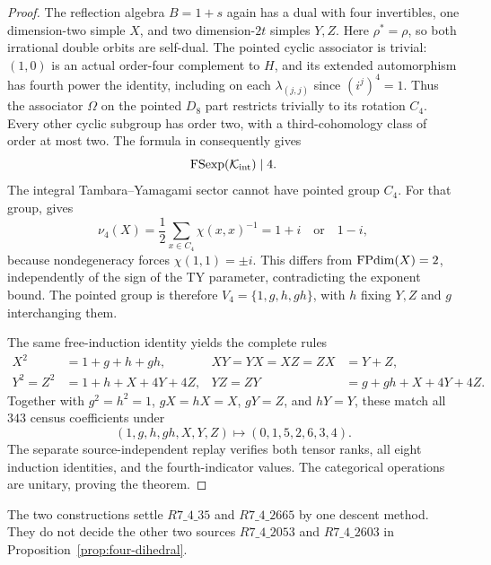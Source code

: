 \begin{proof}
The reflection algebra $B=1+s$ again has a dual with four invertibles,
one dimension-two simple $X$, and two dimension-$2t$ simples $Y,Z$.
Here $\rho^*=\rho$, so both irrational double orbits are self-dual.
The pointed cyclic associator is trivial: $(1,0)$ is an actual
order-four complement to $H$, and its extended automorphism has fourth
power the identity, including on each $\lambda_{(j,j)}$ since
$(i^j)^4=1$.
Thus the associator $\Omega$ on the pointed $D_8$ part restricts
trivially to its rotation $C_4$. Every other cyclic subgroup has
order two, with a third-cohomology class of order at most two.
The formula in \cite[Theorem~9.2]{NgSchauenburgExponent} consequently
gives
\[
 \operatorname{FSexp}(\mathcal K_{\rm int})\mid4.
\]
The integral Tambara--Yamagami sector cannot have pointed group $C_4$.
For that group, \cite[Theorem~3.4 and its specialization]{ShimizuTY}
gives
\[
 \nu_4(X)=\frac12\sum_{x\in C_4}\chi(x,x)^{-1}=1+i
 \quad\text{or}\quad1-i,
\]
because nondegeneracy forces $\chi(1,1)=\pm i$. This differs from
$\operatorname{FPdim}(X)=2$, independently of the sign of the TY parameter,
contradicting the exponent bound. The pointed group is therefore
$V_4=\{1,g,h,gh\}$, with $h$ fixing $Y,Z$ and $g$ interchanging them.

The same free-induction identity yields the complete rules
\begin{align*}
 X^2&=1+g+h+gh,&XY=YX=XZ=ZX&=Y+Z,\\
 Y^2=Z^2&=1+h+X+4Y+4Z,&YZ=ZY&=g+gh+X+4Y+4Z.
\end{align*}
Together with $g^2=h^2=1$, $gX=hX=X$, $gY=Z$, and $hY=Y$,
these match all $343$ census coefficients under
\[
 (1,g,h,gh,X,Y,Z)\longmapsto(0,1,5,2,6,3,4).
\]
The separate source-independent replay verifies both tensor ranks,
all eight induction identities, and the fourth-indicator values.
The categorical operations are unitary, proving the theorem.
\end{proof}

The two constructions settle $R7\_4\_35$ and $R7\_4\_2665$ by one
descent method. They do not decide the other two sources
$R7\_4\_2053$ and $R7\_4\_2603$ in
Proposition~\ref{prop:four-dihedral}.
